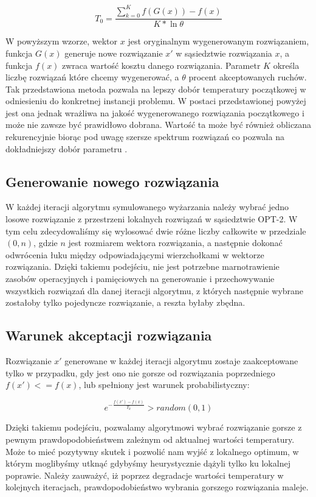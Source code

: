 \begin{equation}
	T_0 = \frac{\sum_{k=0}^{K} f(G(x)) - f(x)}{K * \ln \theta}
\end{equation}

W powyższym wzorze, wektor $x$ jest oryginalnym wygenerowanym rozwiązaniem, funkcja $G(x)$ generuje nowe rozwiązanie $x'$ w sąsiedztwie rozwiązania $x$, a funkcja $f(x)$ zwraca wartość kosztu danego rozwiązania. Parametr $K$ określa liczbę rozwiązań które chcemy wygenerować, a $\theta$ procent akceptowanych ruchów. Tak przedstawiona metoda pozwala na lepszy dobór temperatury początkowej w odniesieniu do konkretnej instancji problemu. W postaci przedstawionej powyżej jest ona jednak wrażliwa na jakość wygenerowanego rozwiązania początkowego i może nie zawsze być prawidłowo dobrana. Wartość ta może być również obliczana rekurencyjnie biorąc pod uwagę szersze spektrum rozwiązań co pozwala na dokładniejszy dobór parametru \cite{saTemperature}. 


\subsection{Generowanie nowego rozwiązania}
W każdej iteracji algorytmu symulowanego wyżarzania należy wybrać jedno losowe rozwiązanie z przestrzeni lokalnych rozwiązań w sąsiedztwie OPT-2. W tym celu zdecydowaliśmy się wylosować dwie różne liczby całkowite w przedziale $(0, n)$, gdzie $n$ jest rozmiarem wektora rozwiązania, a następnie dokonać odwrócenia łuku między odpowiadającymi wierzchołkami w wektorze rozwiązania. Dzięki takiemu podejściu, nie jest potrzebne marnotrawienie zasobów operacyjnych i pamięciowych na generowanie i przechowywanie wszystkich rozwiązań dla danej iteracji algorytmu, z których następnie wybrane zostałoby tylko pojedyncze rozwiązanie, a reszta byłaby zbędna.


\subsection{Warunek akceptacji rozwiązania}
Rozwiązanie $x'$ generowane w każdej iteracji algorytmu zostaje zaakceptowane tylko w przypadku, gdy jest ono nie gorsze od rozwiązania poprzedniego $f(x') <= f(x)$, lub spełniony jest warunek probabilistyczny:

\begin{equation}
	e^{-\frac{f(x') - f(x)}{T_k}} > random(0, 1)
\end{equation} 

Dzięki takiemu podejściu, pozwalamy algorytmowi wybrać rozwiązanie gorsze z pewnym prawdopodobieństwem zależnym od aktualnej wartości temperatury. Może to mieć pozytywny skutek i pozwolić nam wyjść z lokalnego optimum, w którym moglibyśmy utknąć gdybyśmy heurystycznie dążyli tylko ku lokalnej poprawie. Należy zauważyć, iż poprzez degradacje wartości temperatury w kolejnych iteracjach, prawdopodobieństwo wybrania gorszego rozwiązania maleje.


